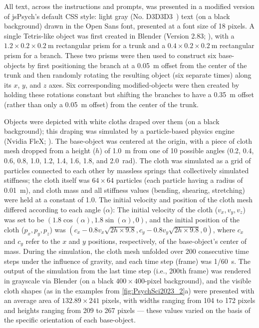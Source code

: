 All text, across the instructions and prompts, was presented in a modified version of jsPsych’s default CSS style: light gray (No. D3D3D3~) text (on a black background) drawn in the Open Sans font, presented at a font size of 18 pixels.
A single Tetris-like object was first created in Blender (Version 2.83; ), with a $1.2 \times 0.2 \times \qty{0.2}{\meter}$ rectangular prism for a trunk and a $0.4 \times 0.2 \times \qty{0.2}{\meter}$ rectangular prism for a branch. These two prisms were then used to construct six base-objects by first positioning the branch at a \qty{0.05}{\meter} offset from the center of the trunk and then randomly rotating the resulting object (six separate times) along its $x$, $y$, and $z$ axes. Six corresponding modified-objects were then created by holding these rotations constant but shifting the branches to have a \qty{0.35}{\meter} offset (rather than only a \qty{0.05}{\meter} offset) from the center of the trunk.

Objects were depicted with white cloths draped over them (on a black background); this draping was simulated by a particle-based physics engine (Nvidia FleX; \cite{macklin_unified_2014}). The base-object was centered at the origin, with a piece of cloth mesh dropped from a height ($h$) of \qty{1.0}{\meter} from one of 10 possible angles (0.2, 0.4, 0.6, 0.8, 1.0, 1.2, 1.4, 1.6, 1.8, and \qty{2.0}{\radian}). The cloth was simulated as a grid of particles connected to each other by massless springs that collectively simulated stiffness; the cloth itself was $64\times64$ particles (each particle having a radius of \qty{0.01}{\meter}), and cloth mass and all stiffness values (bending, shearing, stretching) were held at a constant of 1.0. The initial velocity and position of the cloth mesh differed according to each angle ($\alpha$): The initial velocity of the cloth ($v_x, v_y, v_z$) was set to be $(1.8\cos(\alpha), 1.8\sin(\alpha), 0)$, and the initial position of the cloth ($p_x, p_y, p_z$) was $(c_x - 0.8v_x\sqrt{2h \times 9.8}, c_y - 0.8v_y\sqrt{2h \times 9.8}, 0)$, where $c_x$ and $c_y$ refer to the $x$ and $y$ positions, respectively, of the base-object’s center of mass. During the simulation, the cloth mesh unfolded over 200 consecutive time steps under the influence of gravity, and each time step (frame) was 1/\qty{60}{\second}. The output of the simulation from the last time step (i.e., 200th frame) was rendered in grayscale via Blender (on a black $400\times 400$-pixel background), and the visible cloth shapes (as in the examples from \cref{fig:PsychSci2023_2}a) were presented with an average area of $132.89\times 241$ pixels, with widths ranging from 104 to 172 pixels and heights ranging from 209 to 267 pixels --- these values varied on the basis of the specific orientation of each base-object.

